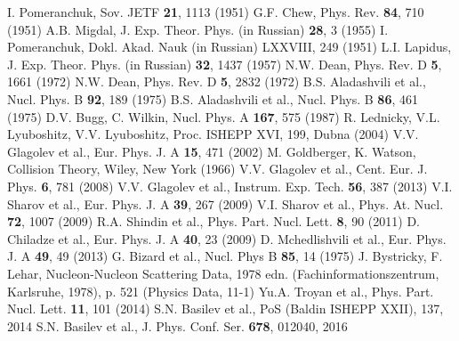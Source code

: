 \documentclass[twocolumn,epjc3]{svjour3}
\begin{document}
\begin{thebibliography}{99}
  I. Pomeranchuk, Sov. JETF \textbf{21}, 1113 (1951)
  G.F. Chew, Phys. Rev. \textbf{84}, 710 (1951)
  A.B. Migdal, J. Exp. Theor. Phys. (in Russian) \textbf{28}, 3 (1955)
  I. Pomeranchuk, Dokl. Akad. Nauk (in Russian) LXXVIII, 249 (1951)
  L.I. Lapidus, J. Exp. Theor. Phys. (in Russian) \textbf{32}, 1437 (1957)
  N.W. Dean, Phys. Rev. D \textbf{5}, 1661 (1972)
  N.W. Dean, Phys. Rev. D \textbf{5}, 2832 (1972)
  B.S. Aladashvili et al., Nucl. Phys. B \textbf{92}, 189 (1975)
  B.S. Aladashvili et al., Nucl. Phys. B \textbf{86}, 461 (1975)
  D.V. Bugg, C. Wilkin, Nucl. Phys. A \textbf{167}, 575 (1987)
  R. Lednicky, V.L. Lyuboshitz, V.V. Lyuboshitz, Proc. ISHEPP XVI, 199,
  Dubna (2004)
  V.V. Glagolev et al., Eur. Phys. J. A \textbf{15}, 471 (2002)
  M. Goldberger, K. Watson, Collision Theory, Wiley, New York (1966)
  V.V. Glagolev et al., Cent. Eur. J. Phys. \textbf{6}, 781 (2008)
  V.V. Glagolev et al., Instrum. Exp. Tech. \textbf{56}, 387 (2013)
  V.I. Sharov et al., Eur. Phys. J. A \textbf{39}, 267 (2009)
  V.I. Sharov et al., Phys. At. Nucl. \textbf{72}, 1007 (2009)
  R.A. Shindin et al., Phys. Part. Nucl. Lett. \textbf{8}, 90 (2011)
  D. Chiladze et al., Eur. Phys. J. A \textbf{40}, 23 (2009)
  D. Mchedlishvili et al., Eur. Phys. J. A \textbf{49}, 49 (2013)
  G. Bizard et al., Nucl. Phys B \textbf{85}, 14 (1975)
  J. Bystricky, F. Lehar, Nucleon-Nucleon Scattering Data, 1978
  edn. (Fachinformationszentrum, Karlsruhe, 1978), p. 521 (Physics Data, 11-1)
  Yu.A. Troyan et al., Phys. Part. Nucl. Lett. \textbf{11}, 101 (2014)
  S.N. Basilev et al., PoS (Baldin ISHEPP XXII), 137, 2014
  S.N. Basilev et al., J. Phys. Conf. Ser. \textbf{678}, 012040, 2016
\end{thebibliography}
\end{document}
